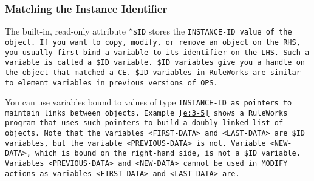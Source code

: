 \subsubsection*{Matching the Instance Identifier}

The built-in, read-only attribute
\verb|^$ID| stores the \tt{INSTANCE-ID} value of the object. If you
want to copy, modify, or remove an object on the RHS, you usually
first bind a variable to its identifier on the LHS. Such a variable is
called a \verb|$ID| variable.
\verb|$ID| variables give you a handle on the object that matched a
CE. \verb|$ID| variables in RuleWorks are similar to element variables
in previous versions of OPS.

You can use variables bound to values of type \tt{INSTANCE-ID} as
pointers to maintain links between objects. Example~\ref{e:3-5} shows a
RuleWorks program that uses such pointers to build a doubly linked
list of objects. Note that the variables \verb|<FIRST-DATA>| and
\verb|<LAST-DATA>| are
\verb|$ID| variables, but the variable \verb|<PREVIOUS-DATA>| is
not. Variable \verb|<NEW-DATA>|, which is bound on the right-hand
side, is not a \verb|$ID| variable. Variables \verb|<PREVIOUS-DATA>|
and \verb|<NEW-DATA>| cannot be used in \tt{MODIFY} actions as
variables \verb|<FIRST-DATA>| and \verb|<LAST-DATA>| are.

